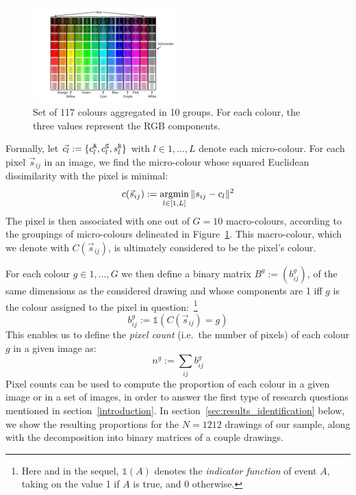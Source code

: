 \documentclass[11pt,a4paper]{article}
\begin{document}
\begin{figure}
	\centering
	\includegraphics[width=0.5\textwidth]{figures/Col_tab.pdf}
	\caption{Set of 117 colours aggregated in 10 groups. For each colour, the three values represent the RGB components. \label{fig:colour_set}}
\end{figure}

Formally, let \(\vec{c_l} := \{ c^{\tt \scriptstyle R}_{l}, c^{\tt \scriptstyle G}_{l}, s^{\tt \scriptstyle B}_{l} \}\) with $l \in 1, ..., L$ denote each micro-colour. For each pixel \(\vec{s}_{ij}\) in an image, we find the micro-colour whose squared Euclidean dissimilarity with the pixel is minimal:
\begin{equation*}
c(\vec{s}_{ij}) := \operatornamewithlimits{argmin}_{l \in [1,L]} \| s_{ij} - c_{l} \|^{2}
\end{equation*}
The pixel is then associated with one out of $G = 10$ macro-colours, according to the groupings of micro-colours delineated in Figure~\ref{fig:colour_set}. This macro-colour, which we denote with $C(\vec{s}_{ij})$, is ultimately considered to be the pixel's colour.

For each colour $g\in 1, \dots, G$ we then define a binary matrix $B^{g} := (b_{ij}^{g})$, of the same dimensions as the considered drawing and whose components are 1 iff $g$ is the colour assigned to the pixel in question:~\footnote{Here and in the sequel, $\mathds{1}(A)$ denotes the \textit{indicator function} of event $A$, taking on the value 1 if $A$ is true, and 0 otherwise.}
\begin{equation}
	b_{ij}^{g} := \mathds{1}(C(\vec{s}_{ij}) = g)
\end{equation}
This enables us to define the \textit{pixel count} (i.e.~the number of pixels) of each colour $g$ in a given image as:
\begin{equation}
	n^{g} := \sum_{ij}b_{ij}^{g}
\end{equation}
Pixel counts can be used to compute the proportion of each colour in a given image or in a set of images, in order to answer the first type of research questions mentioned in section~\ref{introduction}. In section~\ref{sec:results_identification} below, we show the resulting proportions for the $N = 1212$ drawings of our sample, along with the decomposition into binary matrices of a couple drawings.
\end{document}
